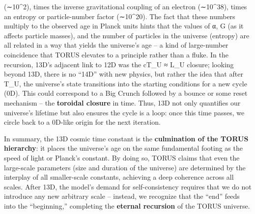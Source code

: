 \documentclass[
]{article}
\begin{document}
(∼10\^{}2), times the inverse gravitational coupling of an electron
(∼10\^{}38), times an entropy or particle-number factor (∼10\^{}20). The
fact that these numbers multiply to the observed age in Planck units
hints that the values of α, G (as it affects particle masses), and the
number of particles in the universe (entropy) are all related in a way
that yields the universe's age -- a kind of large-number coincidence
that TORUS elevates to a principle rather than a fluke\hspace{0pt}. In
the recursion, 13D's adjacent link to 12D was the cT\_U ≈ L\_U closure;
looking beyond 13D, there is no ``14D'' with new physics, but rather the
idea that after T\_U, the universe's state transitions into the starting
conditions for a new cycle (0D)\hspace{0pt}. This could correspond to a
Big Crunch followed by a bounce or some reset mechanism -- the
\textbf{toroidal closure} in time. Thus, 13D not only quantifies our
universe's lifetime but also ensures the cycle is a loop: once this time
passes, we circle back to a 0D-like origin for the next iteration.

In summary, the 13D cosmic time constant is the \textbf{culmination of
the TORUS hierarchy}: it places the universe's age on the same
fundamental footing as the speed of light or Planck's constant. By doing
so, TORUS claims that even the large-scale parameters (size and duration
of the universe) are determined by the interplay of all smaller-scale
constants, achieving a deep coherence across all scales. After 13D, the
model's demand for self-consistency requires that we do not introduce
any new arbitrary scale -- instead, we recognize that the ``end'' feeds
into the ``beginning,'' completing the \textbf{eternal recursion} of the
TORUS universe\hspace{0pt}.
\end{document}
